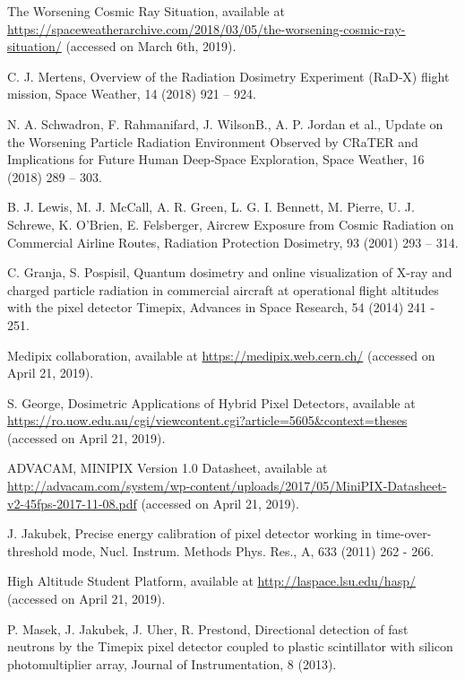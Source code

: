 \begin{thebibliography}{00}
The Worsening Cosmic Ray Situation, available at \url{https://spaceweatherarchive.com/2018/03/05/the-worsening-cosmic-ray-situation/} (accessed on March 6th, 2019).  

 C. J. Mertens, Overview of the Radiation Dosimetry Experiment (RaD‐X) flight mission, Space Weather, 14 (2018) 921 – 924.  
  
 N. A. Schwadron, F. Rahmanifard, J. WilsonB., A. P. Jordan et al., Update on the Worsening Particle Radiation Environment Observed by CRaTER and Implications for Future Human Deep‐Space Exploration, Space Weather, 16 (2018) 289 – 303.  
  
 B. J. Lewis, M. J. McCall, A. R. Green, L. G. I. Bennett, M. Pierre, U. J. Schrewe, K. O'Brien, E. Felsberger, Aircrew Exposure from Cosmic Radiation on Commercial Airline Routes, Radiation Protection Dosimetry, 93 (2001) 293 – 314.
  
 C. Granja, S. Pospisil, Quantum dosimetry and online visualization of X-ray and charged particle radiation in commercial aircraft at operational flight altitudes with the pixel detector Timepix, Advances in Space Research, 54 (2014) 241 - 251.

  Medipix collaboration, available at \url{https://medipix.web.cern.ch/} (accessed on April 21, 2019).
  
  S. George, Dosimetric Applications of Hybrid Pixel Detectors, available at \url{https://ro.uow.edu.au/cgi/viewcontent.cgi?article=5605&context=theses} (accessed on April 21, 2019).

  ADVACAM, MINIPIX Version 1.0 Datasheet, available at \url{http://advacam.com/system/wp-content/uploads/2017/05/MiniPIX-Datasheet-v2-45fps-2017-11-08.pdf} (accessed on April 21, 2019).  

  J. Jakubek, Precise energy calibration of pixel detector working in time-over-threshold mode, Nucl. Instrum. Methods Phys. Res., A, 633 (2011) 262 - 266.

  High Altitude Student Platform, available at \url{http://laspace.lsu.edu/hasp/} (accessed on April 21, 2019).

  P. Masek, J. Jakubek, J. Uher, R. Prestond, Directional detection of fast neutrons by the Timepix pixel detector coupled to plastic scintillator with silicon photomultiplier array, Journal of Instrumentation, 8 (2013).


\end{thebibliography}
